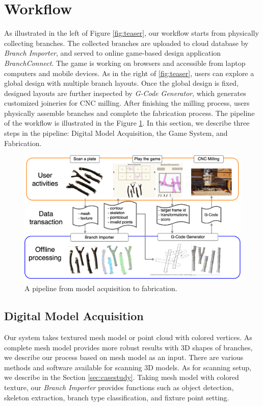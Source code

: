 \section{Workflow}
As illustrated in the left of Figure \ref{fig:teaser}, our workflow starts from physically collecting branches.
The collected branches are uploaded to cloud database by \textit{Branch Importer}, and served to online game-based design application \textit{BranchConnect}.
The game is working on browsers and accessible from laptop computers and mobile devices.
As in the right of \ref{fig:teaser}, users can explore a global design with multiple branch layouts.
Once the global design is fixed, designed layouts are further inspected by \textit{G-Code Generator}, which generates customized joineries for CNC milling.
After finishing the milling process, users physically assemble branches and complete the fabrication process.
The pipeline of the workflow is illustrated in the Figure \ref{fig:pipeline}.
In this section, we describe three steps in the pipeline: Digital Model Acquisition, the Game System, and Fabrication.

\begin{figure}[ht]
  \begin{center}
    \includegraphics[width = 0.4\paperwidth]{images/workflow/pipeline.png}
    \caption{A pipeline from model acquisition to fabrication.}
    \label{fig:pipeline}
  \end{center}
\end{figure}

\subsection{Digital Model Acquisition}
Our system takes textured mesh model or point cloud with colored vertices.
As complete mesh model provides more robust results with 3D shapes of branches, we describe our process based on mesh model as an input.
There are various methods and software available for scanning 3D models.
As for scanning setup, we describe in the Section \ref{sec:casestudy}.
Taking mesh model with colored texture, our \textit{Branch Importer} provides functions such as object detection, skeleton extraction, branch type classification, and fixture point setting.

